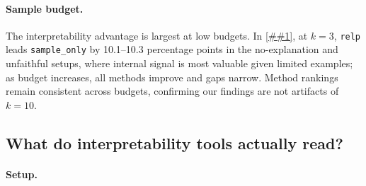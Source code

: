 \documentclass{article} %
\newcommand{\Cref}[1]{\ref{##1}}
\begin{document}
\vspace{-0.15in}
\paragraph{Sample budget.}
The interpretability advantage is largest at low budgets.
In \Cref{fig:budget}, at $k{=}3$, \texttt{relp} leads \texttt{sample\_only} by {10.1--10.3} percentage points in the no-explanation and unfaithful setups, where internal signal is most valuable given limited examples; as budget increases, all methods improve and gaps narrow.
Method rankings remain consistent across budgets, confirming our findings are not artifacts of $k{=}10$.


\subsection{What do interpretability tools actually read?}
\label{sec:mechanistic}

\paragraph{Setup.}
\end{document}
